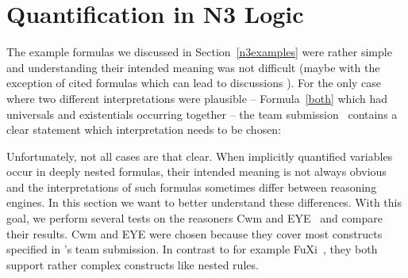 \section{Quantification in N3 Logic}\label{quantsec}
The example formulas we discussed in Section~\ref{n3examples} were rather simple and understanding their intended meaning was not 
 difficult (maybe with the exception of cited formulas which can lead to discussions \cite{TriGsemantics}). For the only case where 
two different interpretations were plausible -- Formula~\ref{both} which had universals and existentials occurring together --
the \wwwc team submission~\cite{Notation3} contains a clear statement which interpretation needs to be chosen: \\


Unfortunately, not all cases are that clear.
% 
% 
%
When implicitly quantified variables occur in deeply nested formulas, 
 their intended meaning is not always obvious and the interpretations of such formulas sometimes differ between reasoning engines. 
%
In this section we want to better understand these differences. 
With this goal, we perform several tests on the reasoners Cwm \cite{cwm} and EYE~\cite{eyepaper} and compare their results. 
Cwm and EYE were chosen because they cover most constructs specified in \nthree{}'s \wwwc team submission. 
In contrast to for example FuXi~\cite{fuxi}, they both support rather complex constructs like nested rules. 



